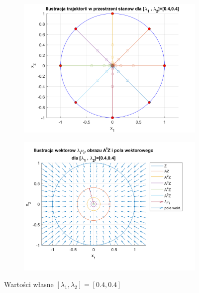 \documentclass{article}
\begin{document}
\begin{figure}[H]
    \centering
    \begin{subfigure}{0.44\textwidth}
        \includegraphics[width=\textwidth]{portret_fazowy_4_4.png}
    \end{subfigure}
    \begin{subfigure}{0.48\textwidth}
        \includegraphics[width=\textwidth]{pole_wektorowe_4_4.png}
    \end{subfigure}
    \caption{Warto\'sci własne $[ \lambda_1, \lambda_2 ]= [ 0.4, 0.4 ]$}
    \label{fig::4i4}
\end{figure}
\end{document}
